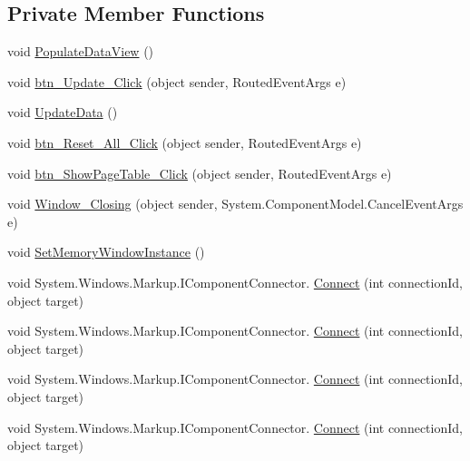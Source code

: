 \subsection*{Private Member Functions}
\begin{DoxyCompactItemize}
\item 
void \hyperlink{class_c_p_u___o_s___simulator_1_1_memory_window_a8811287064d6315e3a8c01531148ed81}{Populate\+Data\+View} ()
\item 
void \hyperlink{class_c_p_u___o_s___simulator_1_1_memory_window_a91ec1c8081b85d3c07eaa31ee524f5d9}{btn\+\_\+\+Update\+\_\+\+Click} (object sender, Routed\+Event\+Args e)
\item 
void \hyperlink{class_c_p_u___o_s___simulator_1_1_memory_window_ab0cb156466262b3d90f19acd422dc65b}{Update\+Data} ()
\item 
void \hyperlink{class_c_p_u___o_s___simulator_1_1_memory_window_ac77beff86f4dd6322bdcf2430892d2aa}{btn\+\_\+\+Reset\+\_\+\+All\+\_\+\+Click} (object sender, Routed\+Event\+Args e)
\item 
void \hyperlink{class_c_p_u___o_s___simulator_1_1_memory_window_a0540a495053120e2572a106dbbc391de}{btn\+\_\+\+Show\+Page\+Table\+\_\+\+Click} (object sender, Routed\+Event\+Args e)
\item 
void \hyperlink{class_c_p_u___o_s___simulator_1_1_memory_window_a6123a0a8b93cb6636ed3c039391948a5}{Window\+\_\+\+Closing} (object sender, System.\+Component\+Model.\+Cancel\+Event\+Args e)
\item 
void \hyperlink{class_c_p_u___o_s___simulator_1_1_memory_window_a5100fa341de6de08d11967198cd82208}{Set\+Memory\+Window\+Instance} ()
\item 
void System.\+Windows.\+Markup.\+I\+Component\+Connector. \hyperlink{class_c_p_u___o_s___simulator_1_1_memory_window_aba65e66795c99052ebed93162110e908}{Connect} (int connection\+Id, object target)
\item 
void System.\+Windows.\+Markup.\+I\+Component\+Connector. \hyperlink{class_c_p_u___o_s___simulator_1_1_memory_window_aba65e66795c99052ebed93162110e908}{Connect} (int connection\+Id, object target)
\item 
void System.\+Windows.\+Markup.\+I\+Component\+Connector. \hyperlink{class_c_p_u___o_s___simulator_1_1_memory_window_aba65e66795c99052ebed93162110e908}{Connect} (int connection\+Id, object target)
\item 
void System.\+Windows.\+Markup.\+I\+Component\+Connector. \hyperlink{class_c_p_u___o_s___simulator_1_1_memory_window_aba65e66795c99052ebed93162110e908}{Connect} (int connection\+Id, object target)
\end{DoxyCompactItemize}
